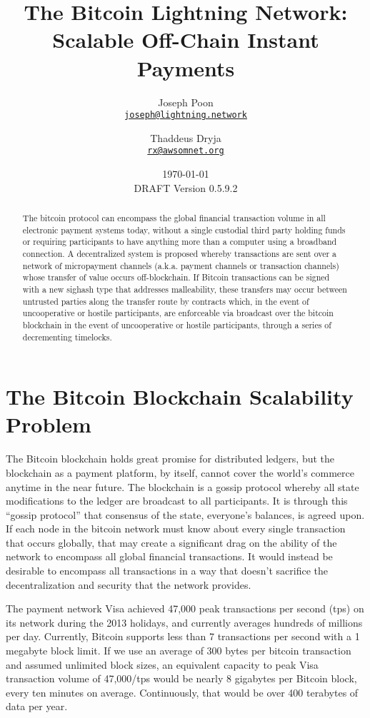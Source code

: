 \documentclass[letterpaper,11pt]{article}
\title{\LARGE The Bitcoin Lightning Network:\\
	\Large Scalable Off-Chain Instant Payments}
\author{
		Joseph Poon\\
		\small\href{mailto:joseph@lightning.network}
			{\nolinkurl{joseph@lightning.network}}
	\and 
		Thaddeus Dryja\\
		\small\href{mailto:rx@awsomnet.org}
			{\nolinkurl{rx@awsomnet.org}}
	}
\date{\today\\\small DRAFT Version 0.5.9.2}
\begin{document}
\maketitle

\begin{abstract}

The bitcoin protocol can encompass the global financial transaction volume in
all electronic payment systems today, without a single custodial third party
holding funds or requiring participants to have anything more than a computer
using a broadband connection. A decentralized system is proposed whereby
transactions are sent over a network of micropayment channels (a.k.a. payment
channels or transaction channels) whose transfer of value occurs
off-blockchain. If Bitcoin transactions can be signed with a new sighash type
that addresses malleability, these transfers may occur between untrusted
parties along the transfer route by contracts which, in the event of
uncooperative or hostile participants, are enforceable via broadcast over the
bitcoin blockchain in the event of uncooperative or hostile participants,
through a series of decrementing timelocks.

\end{abstract}

\section{The Bitcoin Blockchain Scalability Problem}

The Bitcoin\cite{nakamoto} blockchain holds great promise for distributed
ledgers, but the blockchain as a payment platform, by itself, cannot cover the
world's commerce anytime in the near future. The blockchain is a gossip
protocol whereby all state modifications to the ledger are broadcast to all
participants. It is through this ``gossip protocol'' that consensus of the
state, everyone's balances, is agreed upon. If each node in the bitcoin network
must know about every single transaction that occurs globally, that may create
a significant drag on the ability of the network to encompass all global
financial transactions. It would instead be desirable to encompass all
transactions in a way that doesn't sacrifice the decentralization and security
that the network provides.

The payment network Visa achieved 47,000 peak transactions per second (tps) on
its network during the 2013 holidays\cite{visa}, and currently averages hundreds
of millions per day. Currently, Bitcoin supports less than 7 transactions per
second with a 1 megabyte block limit. If we use an average of 300 bytes per
bitcoin transaction and assumed unlimited block sizes, an equivalent capacity to
peak Visa transaction volume of 47,000/tps would be nearly 8 gigabytes per
Bitcoin block, every ten minutes on average. Continuously, that would be over
400 terabytes of data per year.
\end{document}

